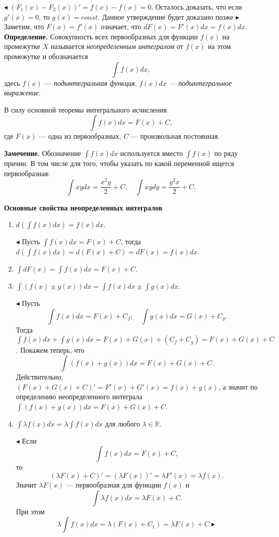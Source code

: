 \documentclass[12pt]{article}
\begin{document}
$\blacktriangleleft$ $(F_1(x) - F_2(x))' = f(x)-f(x) = 0$. Осталось доказать, что если $g'(x) = 0$, то $g(x) = const$. Данное утверждение будет доказано позже $\blacktriangleright$ \\

Заметим, что $F(x) = f'(x)$ означает, что $dF(x)= F'(x)dx = f(x)dx$.\\

\textbf{Определение.} Совокупность всех первообразных для функции $f(x)$ на промежутке $X$ называется \textit{неопределенным интегралом} от $f(x)$ на этом промежутке и обозначается 
$$
	\int f(x)dx,
$$
здесь $f(x)$ --- \textit{подынтегральная функция}, $f(x)dx$ --- \textit{подынтегральное выражение}. 

В силу основной теоремы интегрального исчисления 
$$
	\int f(x)dx = F(x) + C,
$$
где $F(x)$ --- одна из первообразных, $C$ --- произвольная постоянная.


\textbf{Замечение.} Обозначение $\int f(x)dx$ используется вместо $\int f(x)$ по ряду причин. В том числе для того, чтобы указать по какой переменной ищется первообразная:
$$
	\int xy dx = \frac{x^2y}{2} + C, \quad \int xy dy = \frac{y^2x}{2} + C.
$$

\textbf{Основные свойства неопределенных интегралов}

\begin{enumerate}
\item $d \left( \int f(x)dx \right) = f(x)dx$. 

$\blacktriangleleft$ Пусть $\int f(x)dx = F(x) + C$, тогда $ d\left( \int f(x)dx \right) = d \left( F(x) + C \right) = dF(x) = f(x)dx$.

\item $\int dF(x) = \int f(x)dx = F(x) + C$.

\item $\int (f(x) \pm g(x))dx = \int f(x)dx \pm \int g(x)dx$.

$\blacktriangleleft$ Пусть
$$
\int f(x)dx = F(x) + C_f; \quad \int g(x)dx = G(x) + C_g.
$$
Тогда $\int f(x)dx + \int g(x)dx = F(x) + G(x) + (C_f + C_g) = F(x) + G(x) + C$. Покажем теперь, что 
$$
\int (f(x) + g(x))dx = F(x) + G(x) + C.
$$
Действительно, $(F(x) + G(x) + C)' = F'(x) + G'(x) = f(x) + g(x)$, а значит по определению неопределенного интеграла $\int (f(x) + g(x))dx = F(x) + G(x) +C$.

\item $\int \lambda f(x)dx = \lambda \int f(x)dx$ для любого $\lambda \in \mathbb{R}$.

$\blacktriangleleft$ Если 
$$
	\int f(x)dx = F(x) + C,
$$
то 
$$
	(\lambda F(x) + C)' = (\lambda F(x))' = \lambda F'(x) = \lambda f(x).
$$
Значит $\lambda F(x)$ --- первообразная для функции $f(x)$ и
$$
\int \lambda f(x)dx = \lambda F(x) + C.
$$
При этом 
$$
\lambda \int f(x) dx = \lambda (F(x) + C_1) = \lambda F(x) + C \blacktriangleright 
$$
\end{enumerate}
\end{document}
